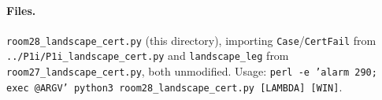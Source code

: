 \documentclass[11pt]{article}
\begin{document}
\paragraph{Files.} \texttt{room28\_landscape\_cert.py} (this directory), importing
\texttt{Case}/\texttt{CertFail} from \texttt{../P1i/P1i\_landscape\_cert.py} and \texttt{landscape\_leg}
from \texttt{room27\_landscape\_cert.py}, both unmodified. Usage:
\texttt{perl -e 'alarm 290; exec @ARGV' python3 room28\_landscape\_cert.py [LAMBDA] [WIN]}.
\end{document}
